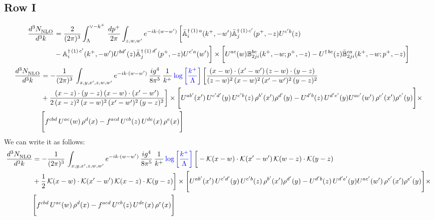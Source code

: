 \documentclass[9pt]{article}
\def\mf#1{\mathbb{#1}}
\numberwithin{equation}{section}
\begin{document}
\subsection{Row I}
\begin{align}
 \frac{d^{3}N_{\rm NLO}^{\rm}}{d^{3}k}  & =    \frac{2}{(2\pi)^{3}} \int_{\Lambda}^{\vee - k^{+}}\, \frac{dp^{+}}{2\pi}\int_{z,w,w^{\prime}} e^{-ik\cdot (w-w')}\, 
        \bigg[\Bar{\mf{A}}^{\dagger\, (1)\, a}_{i}(k^{+},-w^{\prime})\Bar{\mf{A}}^{\dagger\, (1)\, c^{\prime}}_{j}(p^{+},-z)U^{c^{\prime}b}(z)\notag \\ & -\mf{A}^{\dagger\, (1)\, c^{\prime}}_{i}(k^{+},- w^{\prime})U^{bd^{\prime}}(z)\Bar{\mf{A}}^{\dagger\, (1)\, d^{\prime}}_{j}(p^{+},-z)U^{c^{\prime}a}(w^{\prime})  \bigg]\times \bigg[U^{ac}(w) \mf{B}^{bc}_{2ji}(k^{+},-w;p^{+},-z) -U^{\dagger\, bc}(z)\Bar{\mf{B}}^{ca}_{2ji}(k^{+},-w; p^{+},-z)\bigg] \nonumber
\end{align}
\begin{align}
    \frac{d^{3}N_{\rm NLO}^{\rm}}{d^{3}k}  & = -\frac{1}{(2\pi)^{3}}\, \int_{x,y,x',z,w,w^{\prime}} e^{-ik\cdot (w-w')}\,\frac{ig^{4}}{8\pi^{5}}\,\frac{1}{k^{+}}\,{\color{blue}\log{\left[\frac{k^{+}}{\Lambda}\right]}}\,\bigg[\frac{(x-w)\cdot (x'-w')\,(z-w)\cdot (y-z)}{(z-w)^{2}\,(x-w)^{2}\,(x'-w')^{2}\,(y-z)^{2}}\notag \\ & +\frac{(x-z)\cdot (y-z)\,(x-w)\cdot (x'-w')}{2\,(x-z)^{2}\, (x-w)^{2}\,(x'-w')^{2}\,(y-z)^{2}}\bigg]\times  \Bigg[U^{ab'}(x')\,U^{c'd'}(y)\,U^{c'b}(z)\,\rho^{b'}(x')\rho^{d'}(y)-U^{d'b}(z)\,U^{d'e'}(y)U^{ac'}(w')\,\rho^{c'}(x')\rho^{e'}(y)\Bigg]\times\notag \\ & \Bigg[f^{cbd}\,U^{ac}(w)\,\rho^{d}(x)-f^{acd}\, U^{cb}(z)\,U^{de}(x)\,\rho^{e}(x)\Bigg] 
\end{align}
We can write it as follows: 
\begin{align}
    \frac{d^{3}N_{\rm NLO}^{\rm}}{d^{3}k}  & = -\frac{1}{(2\pi)^{3}}\, \int_{x,y,x',z,w,w^{\prime}} e^{-ik\cdot (w-w')}\,\frac{ig^{4}}{8\pi^{5}}\,\frac{1}{k^{+}}\,{\color{blue}\log{\left[\frac{k^{+}}{\Lambda}\right]}}\,\bigg[-\mathcal{K}(x-w)\cdot \mathcal{K}(x'-w')\, \mathcal{K}(w-z)\cdot \mathcal{K}(y-z)\notag \\ & +\frac{1}{2}\,\mathcal{K}(x-w)\cdot \mathcal{K}(x'-w')\, \mathcal{K}(x-z)\cdot \mathcal{K}(y-z)\bigg]\times  \Bigg[U^{ab'}(x')\,U^{c'd'}(y)\,U^{c'b}(z)\,\rho^{b'}(x')\rho^{d'}(y)-U^{d'b}(z)\,U^{d'e'}(y)U^{ac'}(w')\,\rho^{c'}(x')\rho^{e'}(y)\Bigg]\times\notag \\ & \Bigg[f^{cbd}\,U^{ac}(w)\,\rho^{d}(x)-f^{acd}\, U^{cb}(z)\,U^{de}(x)\,\rho^{e}(x)\Bigg] 
\end{align}
\end{document}
